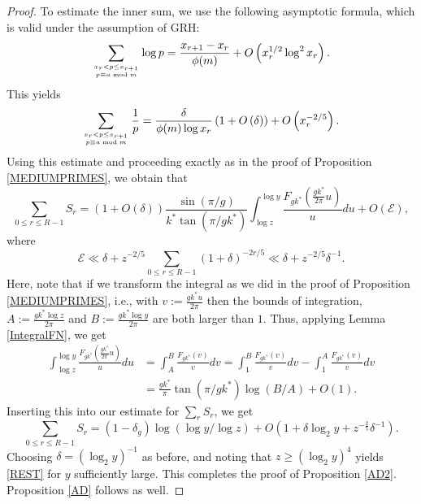 \documentclass[12pt]{amsart}
\theoremstyle{definition}
\numberwithin{equation}{section}
\begin{document}
\begin{proof}
To estimate the inner sum, we use the following asymptotic formula, which is valid under the assumption of GRH:
\begin{equation*}
\sum_{x_r < p \leq x_{r+1} \atop p \equiv a \bmod m} \log p = \frac{x_{r+1}-x_r}{\phi(m)} + O\left(x_{r}^{1/2}\log^2 x_r\right).
\end{equation*}
This yields
\begin{equation*}
\sum_{x_r < p \leq x_{r+1} \atop p \equiv a \bmod m} \frac{1}{p} = \frac{\delta}{\phi(m) \log x_r} \left(1+O\left(\delta\right)\right) + O\left(x_{r}^{-2/5}\right).
\end{equation*}
Using this estimate and proceeding exactly as in the proof of 
Proposition \ref{MEDIUMPRIMES}, we obtain that 
$$
\sum_{0 \leq r \leq R-1} S_r =\left(1+O\left(\delta\right)\right)\frac{\sin(\pi/g)}{k^{\ast}\tan(\pi/gk^{\ast})}\int_{\log z}^{\log y} \frac{F_{gk^{\ast}}\left(\frac{gk^{\ast}}{2\pi} u\right)}{u} du + O\left(\mathcal{E} \right),
$$
where 
$$
\mathcal{E}\ll \delta + z^{-2/5} \sum_{0 \leq r \leq R-1} (1+\delta)^{-2r/5} \ll \delta  + z^{-2/5}\delta^{-1}.
$$
Here, note that if we transform the integral as we did in the proof of Proposition \ref{MEDIUMPRIMES}, i.e., with $v := \frac{gk^{\ast} u}{2\pi}$ then the bounds of integration, $A := \frac{gk^{\ast} \log z}{2\pi}$ and $B:= \frac{gk^{\ast} \log y}{2\pi}$ are both larger than $1$. Thus, applying Lemma \ref{IntegralFN}, we get
\begin{align*}
\int_{\log z}^{\log y} \frac{F_{gk^{\ast}}\left(\frac{gk^{\ast}}{2\pi} u\right)}{u} du &= \int_A^B \frac{F_{gk^{\ast}}(v)}{v} dv = \int_1^B \frac{F_{gk^{\ast}}(v)}{v} dv - \int_1^A \frac{F_{gk^{\ast}}(v)}{v} dv \\
&= \frac{gk^{\ast}}{\pi}\tan(\pi/gk^{\ast}) \log(B/A) + O(1).
\end{align*}
Inserting this into our estimate for $\sum_r S_r$, we get
\begin{equation*}
\sum_{0 \leq r \leq R-1} S_r = (1-\delta_g)\log(\log y/\log z) + O\left(1+\delta \log_2 y + z^{-\frac{2}{5}} \delta^{-1} \right).
\end{equation*}
Choosing $\delta = (\log_2 y)^{-1}$ as before, and noting that  $z\geq (\log_2 y)^4$ yields \eqref{REST} for $y$ sufficiently large. This completes the proof of Proposition \ref{AD2}. Proposition \ref{AD} follows as well. 
\end{proof}


\end{document}
